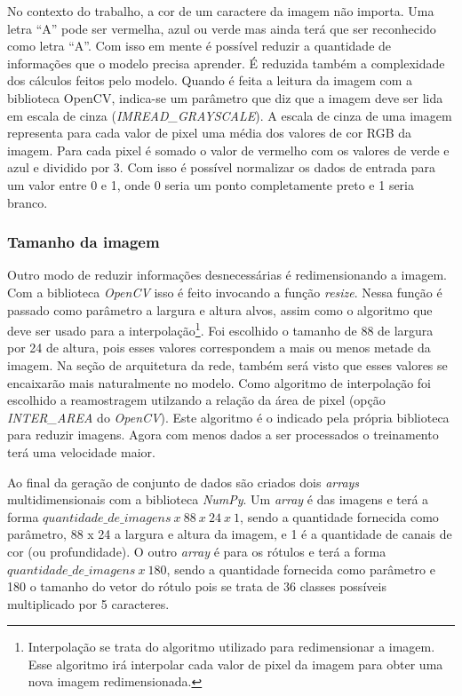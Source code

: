 No contexto do trabalho, a cor de um caractere da imagem não
importa. Uma letra ``A'' pode ser vermelha, azul ou verde mas ainda 
terá que ser reconhecido como letra ``A''. Com isso em mente é
possível reduzir a quantidade de informações que o modelo precisa
aprender. É reduzida também a complexidade dos cálculos feitos pelo
modelo. Quando é feita a leitura da imagem com a biblioteca OpenCV,
indica-se um parâmetro que diz que a imagem deve ser lida em escala de
cinza (\textit{IMREAD\_GRAYSCALE}). A escala de cinza de uma imagem
representa para cada valor de pixel uma média dos valores de cor RGB
da imagem. Para cada pixel é somado o valor de vermelho com os valores
de verde e azul e dividido por 3. Com isso é possível normalizar os
dados de entrada para um valor entre 0 e 1, onde 0 seria um ponto
completamente preto e 1 seria branco.

\subsubsection{Tamanho da imagem}

Outro modo de reduzir informações desnecessárias é redimensionando a
imagem. Com a biblioteca \textit{OpenCV} isso é feito invocando a
função \textit{resize}. Nessa função é passado como parâmetro a largura
e altura alvos, assim como o algoritmo que deve ser usado para a
interpolação\footnote{Interpolação se trata do algoritmo utilizado
  para redimensionar a imagem. Esse algoritmo irá interpolar cada
  valor de pixel da imagem para obter uma nova imagem
  redimensionada.}. Foi escolhido o tamanho de 88 de largura por 24 de
altura, pois esses valores correspondem a mais ou menos metade da
imagem. Na seção de arquitetura da rede, também será visto que esses
valores se encaixarão mais naturalmente no modelo. Como
algoritmo de interpolação foi escolhido a reamostragem utilzando a
relação da área de pixel (opção \textit{INTER\_AREA} do
\textit{OpenCV}). Este algoritmo é o indicado pela própria biblioteca
para reduzir imagens. Agora com menos dados a ser processados o
treinamento terá uma velocidade maior.

Ao final da geração de conjunto de dados são criados dois \textit{arrays}
multidimensionais com a biblioteca \textit{NumPy}. Um \textit{array} é das
imagens e terá a forma $quantidade\_de\_imagens\ x\ 88\ x\ 24\ x\ 1$,
sendo a quantidade fornecida como parâmetro, 88 x 24 a largura e
altura da imagem, e 1 é a quantidade de canais de cor (ou
profundidade). O outro \textit{array} é para os rótulos e terá a forma
$quantidade\_de\_imagens\ x\ 180$, sendo a quantidade fornecida como
parâmetro e 180 o tamanho do vetor do rótulo pois se trata de 36
classes possíveis multiplicado por 5 caracteres.

